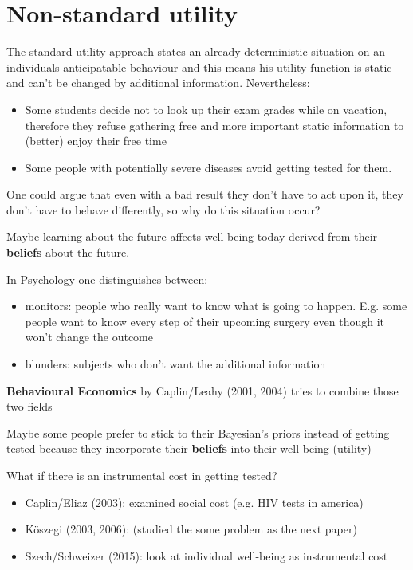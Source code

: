 
\chapter{Non-standard utility}



The standard utility approach states an already deterministic situation on an individuals anticipatable behaviour and this means his utility function is static and can't be changed by additional information. Nevertheless:

\begin{itemize}
	\item Some students decide not to look up their exam grades while on vacation, therefore they refuse gathering free and more important static information to (better) enjoy their free time
	\item Some people with potentially severe diseases avoid getting tested for them.
\end{itemize}

One could argue that even with a bad result they don't have to act upon it, they don't have to behave differently, so why do this situation occur? 

Maybe learning about the future affects well-being today derived from their \textbf{beliefs} about the future.

In Psychology one distinguishes between:
\begin{itemize}
	\item monitors: people who really want to know what is going to happen. E.g. some people want to know every step of their upcoming surgery even though it won't change the outcome
	\item blunders: subjects who don't want the additional information
\end{itemize}

\textbf{Behavioural Economics} by Caplin/Leahy (2001, 2004) tries to combine those two fields

Maybe some people prefer to stick to their Bayesian's priors instead of getting tested because they incorporate their \textbf{beliefs} into their well-being (utility)
~\newline

What if there is an instrumental cost in getting tested?
\begin{itemize}
	\item Caplin/Eliaz (2003): examined social cost (e.g. HIV tests in america)
	\item Köszegi (2003, 2006): (studied the some problem as the next paper)
	\item Szech/Schweizer (2015): look at individual well-being as instrumental cost
\end{itemize}

